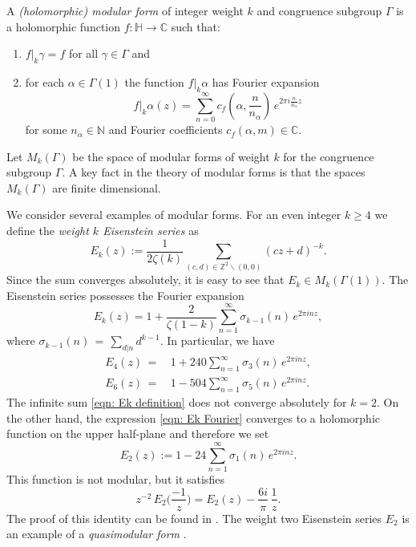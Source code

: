 \documentclass{scrartcl}
\newcommand{\N}{\mathbb{N}}
\newcommand{\Z}{\mathbb{Z}}
\newcommand{\C}{\mathbb{C}}
\newcommand{\h}{\mathbb{H}}
\begin{document}
A \emph{(holomorphic) modular form} of integer weight $k$ and congruence subgroup $\Gamma$ is a holomorphic function $f:\h\to\C$ such that:
\begin{enumerate}
 \item $f|_k\gamma=f$ for all $\gamma\in\Gamma$ and
 \item for each $\alpha\in\Gamma(1)$ the function $f|_k\alpha$ has Fourier expansion $$f|_k\alpha (z)=\sum_{n=0}^\infty c_f(\alpha,\frac{n}{n_\alpha})\,e^{2\pi i \frac{n}{n_\alpha}z}$$ for some $n_\alpha\in\N$ and Fourier coefficients $c_f(\alpha,m)\in\C$.
\end{enumerate}

Let $M_k(\Gamma)$ be the space of modular forms of weight $k$ for the congruence subgroup $\Gamma$. A key fact in the theory of modular forms is that the spaces $M_k(\Gamma)$ are finite dimensional.

We consider several examples of modular forms. For an even integer $k\geq 4$ we define the \emph{weight $k$ Eisenstein series} as
\begin{equation}\label{eqn: Ek definition}E_k(z):=\frac{1}{2\zeta(k)}\sum_{(c,d)\in\Z^2\backslash(0,0)}(cz+d)^{-k}.\end{equation}
Since the sum converges absolutely, it is easy to see that $E_k\in M_k(\Gamma(1))$. The
Eisenstein series possesses the Fourier expansion
\begin{equation}\label{eqn: Ek Fourier}E_k(z)=1+\frac{2}{\zeta(1-k)}\sum_{n=1}^\infty \sigma_{k-1}(n)\,e^{2\pi i n z}, \end{equation}
where $\sigma_{k-1}(n)\,=\,\sum_{d|n} d^{k-1}$. In particular, we have
\begin{align*}
  E_4(z)\,=\,& 1+240\sum_{n=1}^\infty \sigma_3(n)\,e^{2\pi i n z} ,\\
  E_6(z)\,=\,& 1-504\sum_{n=1}^\infty \sigma_5(n)\,e^{2\pi i n z}.
\end{align*}
The infinite sum \eqref{eqn: Ek definition} does not converge absolutely for $k=2$. On the other hand, the expression \eqref{eqn: Ek Fourier} converges to a holomorphic function on the upper half-plane and therefore we set
  \begin{equation}\label{eqn: E2 def}E_2(z):= 1-24\sum_{n=1}^\infty \sigma_1(n)\,e^{2\pi i n z}.\end{equation}
This function is not modular, but it satisfies
\begin{equation}\label{eqn: E2 transform}z^{-2}\,E_2\Big(\frac{-1}{z}\Big)=E_2(z) -\frac{6i}{\pi}\, \frac{1}{z}.\end{equation}
The proof of this identity can be found in \cite[Section~2.3]{1-2-3}.
The weight two Eisenstein series $E_2$ is an example of a \emph{quasimodular form} \cite[Section~5.1]{1-2-3}.
\end{document}
